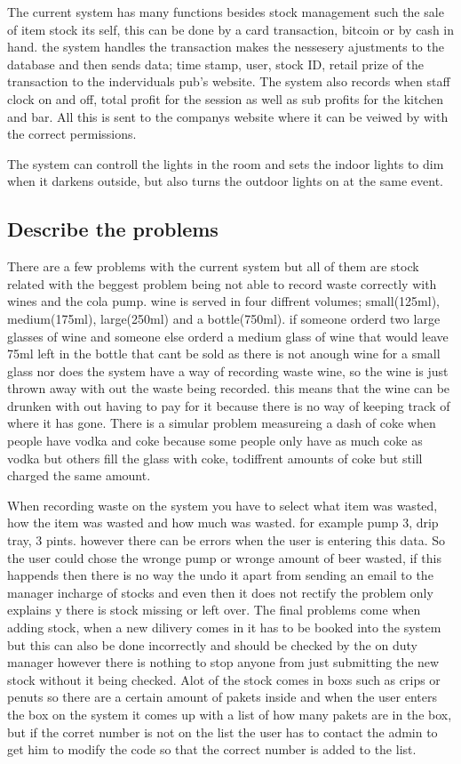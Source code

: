 The current system has many functions besides stock management such the sale of item stock its self, this can be done by a card transaction, bitcoin or by cash in hand. the system handles the transaction makes the nessesery ajustments to the database and then sends data; time stamp, user, stock ID, retail prize of the transaction to the inderviduals pub's website. The system also records when staff clock on and off, total profit for the session as well as sub profits for the kitchen and bar. All this is sent to the companys website where it can be veiwed by with the correct permissions.

The system can controll the lights in the room and sets the indoor lights to dim when it darkens outside, but also turns the outdoor lights on at the same event. 


\subsection{Describe the problems}

There are a few problems with the current system but all of them are stock related with the beggest problem being not able to record waste correctly with wines and the cola pump. wine is served in four diffrent volumes; small(125ml), medium(175ml), large(250ml) and a bottle(750ml). if someone orderd two large glasses of wine and someone else orderd a medium glass of wine that would leave 75ml left in the bottle that cant be sold as there is not anough wine for a small glass nor does the system have a way of recording waste wine, so the wine is just thrown away with out the waste being recorded. this means that the wine can be drunken with out having to pay for it because there is no way of keeping track of where it has gone. There is a simular problem measureing a dash of coke when people have vodka and coke because some people only have as much coke as vodka but others fill the glass with coke, todiffrent amounts of coke but still charged the same amount.

When recording waste on the system you have to select what item was wasted, how the item was wasted and how much was wasted. for example pump 3, drip tray, 3 pints. however there can be errors when the user is entering this data. So the user could chose the wronge pump or wronge amount of beer wasted, if this happends then there is no way the undo it apart from sending an email to the manager incharge of stocks and even then it does not rectify the problem only explains y there is stock missing or left over. The final problems come when adding stock, when a new dilivery comes in it has to be booked into the system but this can also be done incorrectly and should be checked by the on duty manager however there is nothing to stop anyone from just submitting the new stock without it being checked. Alot of the stock comes in boxs such as crips or penuts so there are a certain amount of pakets inside and when the user enters the box on the system it comes up with a list of how many pakets are in the box, but if the corret number is not on the list the user has to contact the admin to get him to modify the code so that the correct number is added to the list.


